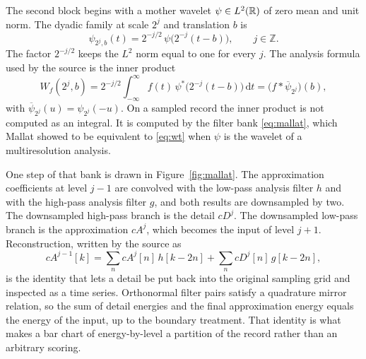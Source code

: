 The second block begins with a mother wavelet \(\psi\in L^{2}(\mathbb{R})\) of zero mean and unit norm.
The dyadic family at scale \(2^{j}\) and translation \(b\) is
\begin{equation}
\psi_{2^{j}, b}(t)=2^{-j/2}\,\psi\bigl(2^{-j}(t-b)\bigr),\qquad j\in\mathbb{Z}.
\label{eq:dyadic}
\end{equation}
The factor \(2^{-j/2}\) keeps the \(L^{2}\) norm equal to one for every \(j\).
The analysis formula used by the source is the inner product
\begin{equation}
W_{f}(2^{j}, b)=2^{-j/2}\int_{-\infty}^{\infty} f(t)\,\psi^{*}\bigl(2^{-j}(t-b)\bigr)\,\mathrm{d}t
=\bigl(f*\overline{\psi}_{2^{j}}\bigr)(b),
\label{eq:wt}
\end{equation}
with \(\overline{\psi}_{2^{j}}(u)=\psi_{2^{j}}(-u)\).
On a sampled record the inner product is not computed as an integral.
It is computed by the filter bank \eqref{eq:mallat}, which Mallat showed to be equivalent to \eqref{eq:wt} when \(\psi\) is the wavelet of a multiresolution analysis.

One step of that bank is drawn in Figure~\ref{fig:mallat}.
The approximation coefficients at level \(j-1\) are convolved with the low-pass analysis filter \(h\) and with the high-pass analysis filter \(g\), and both results are downsampled by two.
The downsampled high-pass branch is the detail \(cD^{j}\).
The downsampled low-pass branch is the approximation \(cA^{j}\), which becomes the input of level \(j+1\).
Reconstruction, written by the source as
\begin{equation}
cA^{j-1}[k]=\sum_{n} cA^{j}[n]\,h[k-2n]+\sum_{n} cD^{j}[n]\,g[k-2n],
\label{eq:recon}
\end{equation}
is the identity that lets a detail be put back into the original sampling grid and inspected as a time series.
Orthonormal filter pairs satisfy a quadrature mirror relation, so the sum of detail energies and the final approximation energy equals the energy of the input, up to the boundary treatment.
That identity is what makes a bar chart of energy-by-level a partition of the record rather than an arbitrary scoring.


